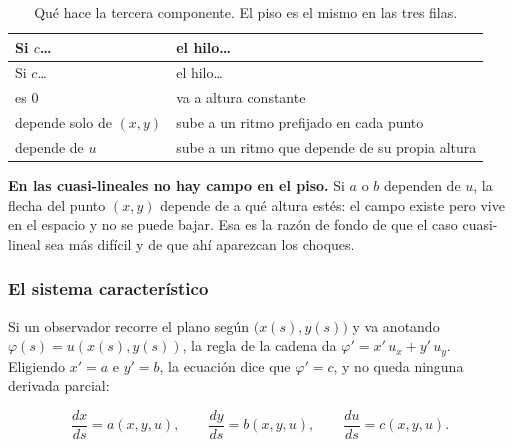 \documentclass[
  spanish,
  a4paper,
]{scrbook}
\theoremstyle{definition}
\theoremstyle{plain}
\theoremstyle{definition}
\theoremstyle{plain}
\theoremstyle{definition}
\theoremstyle{remark}
\begin{document}
\begin{longtable}[]{@{}ll@{}}
\caption{Qué hace la tercera componente. El piso es el mismo en las tres
filas.}\tabularnewline
\toprule\noalign{}
Si \(c\)\ldots{} & el hilo\ldots{} \\
\midrule\noalign{}
\endfirsthead
\toprule\noalign{}
Si \(c\)\ldots{} & el hilo\ldots{} \\
\midrule\noalign{}
\endhead
\bottomrule\noalign{}
\endlastfoot
es \(0\) & va a altura constante \\
depende solo de \((x,y)\) & sube a un ritmo prefijado en cada punto \\
depende de \(u\) & sube a un ritmo que depende de su propia altura \\
\end{longtable}

\textbf{En las cuasi-lineales no hay campo en el piso.} Si \(a\) o \(b\)
dependen de \(u\), la flecha del punto \((x,y)\) depende de a qué altura
estés: el campo existe pero vive en el espacio y no se puede bajar. Esa
es la razón de fondo de que el caso cuasi-lineal sea más difícil y de
que ahí aparezcan los choques.

\subsubsection{El sistema
característico}\label{el-sistema-caracteruxedstico}

Si un observador recorre el plano según \(\big(x(s),y(s)\big)\) y va
anotando \(\varphi(s) = u(x(s),y(s))\), la regla de la cadena da
\(\varphi' = x'\,u_x + y'\,u_y\). Eligiendo \(x' = a\) e \(y' = b\), la
ecuación dice que \(\varphi' = c\), y no queda ninguna derivada parcial:

\[
\boxed{\;\frac{dx}{ds} = a(x,y,u), \qquad
\frac{dy}{ds} = b(x,y,u), \qquad
\frac{du}{ds} = c(x,y,u).\;}
\]
\end{document}
